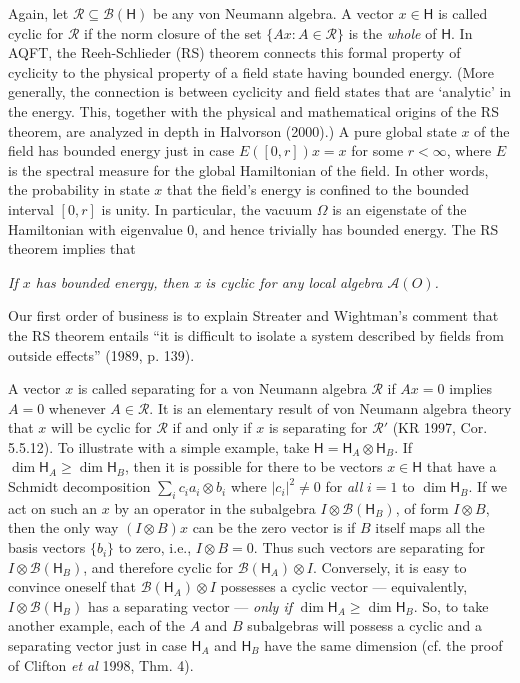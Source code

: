 \documentclass[12pt]{article}
\newcommand{\alg}[1]{\mbox{$\mathcal{#1}$}}
\newcommand{\hil}[1]{\mbox{$\mathsf{#1}$}}
\begin{document}
     Again, let $\alg{R}\subseteq\alg{B}(\hil{H})$ be any von Neumann 
     algebra.  A vector $x\in\hil{H}$ is called cyclic for $\alg{R}$ 
     if the norm closure of the set $\{Ax:A\in\alg{R}\}$
          is the \emph{whole} of $\hil{H}$. In AQFT, the Reeh-Schlieder 
     (RS) theorem 
     connects this formal property of cyclicity to the physical 
     property of a field state having bounded energy.  (More 
     generally, the connection is between cyclicity and field states that 
     are `analytic' in the energy.  This, together with the physical and 
     mathematical origins of the RS theorem, are analyzed in depth in Halvorson (2000).)  A pure global state $x$ of the field 
     has bounded energy just in case $E([0,r])x=x$ for some 
     $r<\infty$, where $E$ is the spectral measure for the global 
     Hamiltonian of the field.  In other words, the probability in 
     state $x$  
     that the field's energy is confined to the bounded interval 
     $[0,r]$ is unity.  In particular, the vacuum $\Omega$ is an eigenstate 
     of the Hamiltonian 
     with eigenvalue $0$, and hence trivially has bounded energy.  The 
     RS theorem implies that 
     \begin{center}
     \emph{If $x$ has bounded energy, then x is cyclic for any local
        algebra $\alg{A}(O)$.}\end{center}
       \noindent Our first order of business is to explain Streater and Wightman's 
 comment that the RS 
     theorem entails ``it is difficult 
to isolate a system described by fields from outside effects'' (1989, p. 
139).  

A vector $x$ is called separating for a von Neumann algebra $\alg{R}$ if $Ax=0$ 
implies $A=0$ whenever $A\in\alg{R}$.  It is an elementary result
of von Neumann algebra theory that $x$ will be cyclic for 
$\alg{R}$ if and only if $x$ is separating for $\alg{R}'$ (KR 1997, Cor. 
5.5.12).   To illustrate with a simple example, take 
$\hil{H}=\hil{H}_{A}\otimes \hil{H}_{B}$.  If $\dim\hil{H}_{A}\geq\dim\hil{H}_{B}$, 
then it is possible for there to be vectors $x\in\hil{H}$ that have a Schmidt 
decomposition $\sum_{i}c_{i}a_{i}\otimes b_{i}$ 
where $|c_{i}|^{2}\not=0$ for \emph{all} $i=1$ to $\dim\hil{H}_{B}$.  If we act on such an $x$ by an 
operator in the subalgebra $I\otimes\alg{B}(\hil{H}_{B})$, of form 
$I\otimes B$, then the only way $(I\otimes B)x$ can be the zero vector is if 
$B$ itself maps all the basis vectors $\{b_{i}\}$ to zero, i.e., $I\otimes 
B=0$.  Thus such vectors are separating for 
$I\otimes\alg{B}(\hil{H}_{B})$, and therefore cyclic for 
$\alg{B}(\hil{H}_{A})\otimes I$.  Conversely, it is easy to convince 
oneself that 
$\alg{B}(\hil{H}_{A})\otimes I$ possesses a cyclic vector 
--- equivalently, $I\otimes\alg{B}(\hil{H}_{B})$  has a separating 
vector --- 
\emph{only if} $\dim\hil{H}_{A}\geq\dim 
\hil{H}_{B}$.  So, to take another example, each of the $A$ and $B$ subalgebras 
will possess a cyclic and a separating vector just in case  
$\hil{H}_{A}$ and 
$\hil{H}_{B}$ have the same dimension (cf. the proof of Clifton \emph{et 
al} 1998, Thm. 4).  
\end{document}
